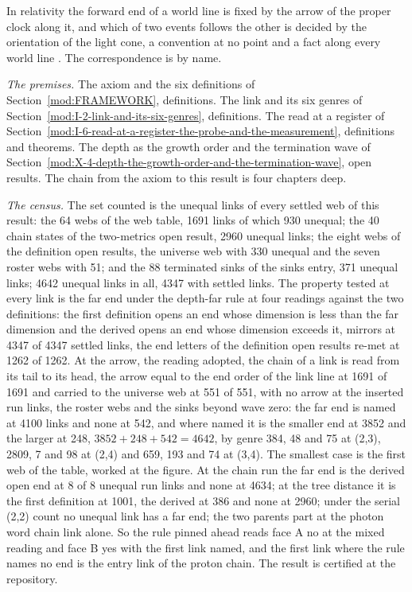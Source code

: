 \begin{chbridge}
In relativity the forward end of a world line is fixed by the arrow of the proper clock along it, and which of two events follows the other is decided by the orientation of the light cone, a convention at no point and a fact along every world line \cite{Minkowski1908,HawkingEllis1973}. The correspondence is by name.
\end{chbridge}
\begin{chproof}
\textit{The premises.} The axiom and the six definitions of Section~\ref{mod:FRAMEWORK}, definitions. The link and its six genres of Section~\ref{mod:I-2-link-and-its-six-genres}, definitions. The read at a register of Section~\ref{mod:I-6-read-at-a-register-the-probe-and-the-measurement}, definitions and theorems. The depth as the growth order and the termination wave of Section~\ref{mod:X-4-depth-the-growth-order-and-the-termination-wave}, open results. The chain from the axiom to this result is four chapters deep.

\textit{The census.} The set counted is the unequal links of every settled web of this result: the 64 webs of the web table, 1691 links of which 930 unequal; the 40 chain states of the two-metrics open result, 2960 unequal links; the eight webs of the definition open results, the universe web with 330 unequal and the seven roster webs with 51; and the 88 terminated sinks of the sinks entry, 371 unequal links; 4642 unequal links in all, 4347 with settled links. The property tested at every link is the far end under the depth-far rule at four readings against the two definitions: the first definition opens an end whose dimension is less than the far dimension and the derived opens an end whose dimension exceeds it, mirrors at 4347 of 4347 settled links, the end letters of the definition open results re-met at 1262 of 1262. At the arrow, the reading adopted, the chain of a link is read from its tail to its head, the arrow equal to the end order of the link line at 1691 of 1691 and carried to the universe web at 551 of 551, with no arrow at the inserted run links, the roster webs and the sinks beyond wave zero: the far end is named at 4100 links and none at 542, and where named it is the smaller end at 3852 and the larger at 248, $3852 + 248 + 542 = 4642$, by genre 384, 48 and 75 at (2,3), 2809, 7 and 98 at (2,4) and 659, 193 and 74 at (3,4). The smallest case is the first web of the table, worked at the figure. At the chain run the far end is the derived open end at 8 of 8 unequal run links and none at 4634; at the tree distance it is the first definition at 1001, the derived at 386 and none at 2960; under the serial (2,2) count no unequal link has a far end; the two parents part at the photon word chain link alone. So the rule pinned ahead reads face A no at the mixed reading and face B yes with the first link named, and the first link where the rule names no end is the entry link of the proton chain. The result is certified at the repository.


\end{chproof}
